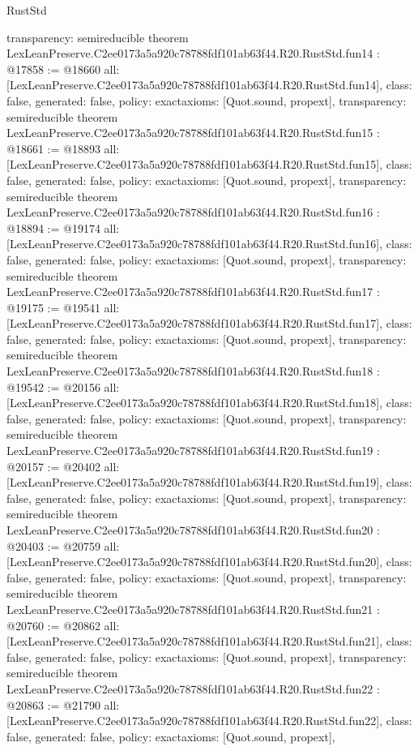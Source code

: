 \begin{lexlean}{RustStd}
\begin{coremodule}
{  transparency: semireducible
}
theorem LexLeanPreserve.C2ee0173a5a920c78788fdf101ab63f44.R20.RustStd.fun14 : @17858 := @18660 {
  all: [LexLeanPreserve.C2ee0173a5a920c78788fdf101ab63f44.R20.RustStd.fun14],
  class: false,
  generated: false,
  policy: exact{axioms: [Quot.sound, propext]},
  transparency: semireducible
}
theorem LexLeanPreserve.C2ee0173a5a920c78788fdf101ab63f44.R20.RustStd.fun15 : @18661 := @18893 {
  all: [LexLeanPreserve.C2ee0173a5a920c78788fdf101ab63f44.R20.RustStd.fun15],
  class: false,
  generated: false,
  policy: exact{axioms: [Quot.sound, propext]},
  transparency: semireducible
}
theorem LexLeanPreserve.C2ee0173a5a920c78788fdf101ab63f44.R20.RustStd.fun16 : @18894 := @19174 {
  all: [LexLeanPreserve.C2ee0173a5a920c78788fdf101ab63f44.R20.RustStd.fun16],
  class: false,
  generated: false,
  policy: exact{axioms: [Quot.sound, propext]},
  transparency: semireducible
}
theorem LexLeanPreserve.C2ee0173a5a920c78788fdf101ab63f44.R20.RustStd.fun17 : @19175 := @19541 {
  all: [LexLeanPreserve.C2ee0173a5a920c78788fdf101ab63f44.R20.RustStd.fun17],
  class: false,
  generated: false,
  policy: exact{axioms: [Quot.sound, propext]},
  transparency: semireducible
}
theorem LexLeanPreserve.C2ee0173a5a920c78788fdf101ab63f44.R20.RustStd.fun18 : @19542 := @20156 {
  all: [LexLeanPreserve.C2ee0173a5a920c78788fdf101ab63f44.R20.RustStd.fun18],
  class: false,
  generated: false,
  policy: exact{axioms: [Quot.sound, propext]},
  transparency: semireducible
}
theorem LexLeanPreserve.C2ee0173a5a920c78788fdf101ab63f44.R20.RustStd.fun19 : @20157 := @20402 {
  all: [LexLeanPreserve.C2ee0173a5a920c78788fdf101ab63f44.R20.RustStd.fun19],
  class: false,
  generated: false,
  policy: exact{axioms: [Quot.sound, propext]},
  transparency: semireducible
}
theorem LexLeanPreserve.C2ee0173a5a920c78788fdf101ab63f44.R20.RustStd.fun20 : @20403 := @20759 {
  all: [LexLeanPreserve.C2ee0173a5a920c78788fdf101ab63f44.R20.RustStd.fun20],
  class: false,
  generated: false,
  policy: exact{axioms: [Quot.sound, propext]},
  transparency: semireducible
}
theorem LexLeanPreserve.C2ee0173a5a920c78788fdf101ab63f44.R20.RustStd.fun21 : @20760 := @20862 {
  all: [LexLeanPreserve.C2ee0173a5a920c78788fdf101ab63f44.R20.RustStd.fun21],
  class: false,
  generated: false,
  policy: exact{axioms: [Quot.sound, propext]},
  transparency: semireducible
}
theorem LexLeanPreserve.C2ee0173a5a920c78788fdf101ab63f44.R20.RustStd.fun22 : @20863 := @21790 {
  all: [LexLeanPreserve.C2ee0173a5a920c78788fdf101ab63f44.R20.RustStd.fun22],
  class: false,
  generated: false,
  policy: exact{axioms: [Quot.sound, propext]},
}
\end{coremodule}
\end{lexlean}
